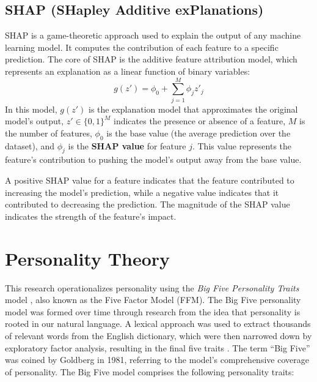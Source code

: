 \subsection{SHAP (SHapley Additive exPlanations)}
SHAP is a game-theoretic approach used to explain the output of any machine learning model. It computes the contribution of each feature to a specific prediction. The core of SHAP is the additive feature attribution model, which represents an explanation as a linear function of binary variables:
$$g(z') = \phi_0 + \sum_{j=1}^{M} \phi_j z'_j$$
In this model, $g(z')$ is the explanation model that approximates the original model's output, $z' \in \{0, 1\}^M$ indicates the presence or absence of a feature, $M$ is the number of features, $\phi_0$ is the base value (the average prediction over the dataset), and $\phi_j$ is the \textbf{SHAP value} for feature $j$. This value represents the feature's contribution to pushing the model's output away from the base value.

A positive SHAP value for a feature indicates that the feature contributed to increasing the model's prediction, while a negative value indicates that it contributed to decreasing the prediction. The magnitude of the SHAP value indicates the strength of the feature’s impact.

\section{Personality Theory}

This research operationalizes personality using the \textit{Big Five Personality Traits} model \citep{costa1999five}, also known as the Five Factor Model (FFM). The Big Five personality model was formed over time through research from the idea that personality is rooted in our natural language. A lexical approach was used to extract thousands of relevant words from the English dictionary, which were then narrowed down by exploratory factor analysis, resulting in the final five traits \citep{feher2021looking}. The term “Big Five” was coined by Goldberg in 1981, referring to the model’s comprehensive coverage of personality. The Big Five model comprises the following personality traits:

